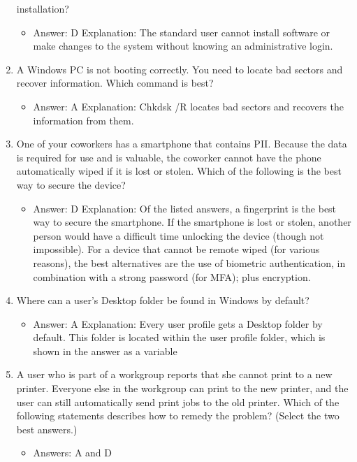 \documentclass{article}
\begin{document}
\begin{enumerate}
installation?
    \begin{itemize}
        \item Answer: D
Explanation: The standard user cannot install software or make changes to the system
without knowing an administrative login.
    \end{itemize}
    \item A Windows PC is not booting correctly. You need to locate bad
sectors and recover information. Which command is best?
    \begin{itemize}
        \item Answer: A
Explanation: Chkdsk /R locates bad sectors and recovers the information from
them.
    \end{itemize}
    \item One of your coworkers has a smartphone that contains PII.
Because the data is required for use and is valuable, the coworker
cannot have the phone automatically wiped if it is lost or stolen.
Which of the following is the best way to secure the device?
    \begin{itemize}
        \item Answer: D
Explanation: Of the listed answers, a fingerprint is the best way to secure the smartphone.
If the smartphone is lost or stolen, another person would have a difficult time
unlocking the device (though not impossible). For a device that cannot be remote
wiped (for various reasons), the best alternatives are the use of biometric authentication,
in combination with a strong password (for MFA); plus encryption.
    \end{itemize}
    \item Where can a user’s Desktop folder be found in Windows by
default?
    \begin{itemize}
        \item Answer: A
Explanation: Every user profile gets a Desktop folder by default. This folder is located
within the user profile folder, which is shown in the answer as a variable
    \end{itemize}
    \item A user who is part of a workgroup reports that she cannot print to
a new printer. Everyone else in the workgroup can print to the new
printer, and the user can still automatically send print jobs to the
old printer. Which of the following statements describes how to
remedy the problem? (Select the two best answers.)
    \begin{itemize}
        \item Answers: A and D

\end{itemize}
\end{enumerate}
\end{document}
